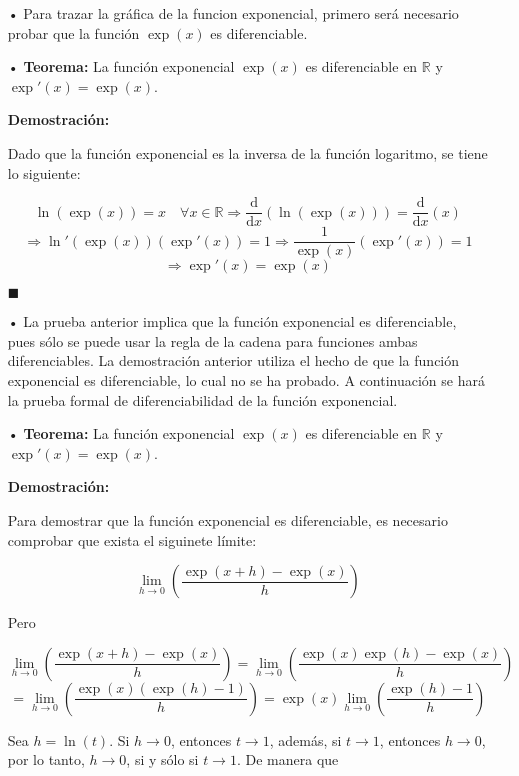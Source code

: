 \documentclass[pts12]{article}
\numberwithin{equation}{section}
\newcommand{\Col}{\color{ProcessBlue}}
\newcommand{\derivate}[2]{\frac{\mathrm{d}}{\mathrm{d}#1} \left(  {#2}  \right)  }
\begin{document}
\begin{itemize}
\item[\Col •] Para trazar la gráfica de la funcion exponencial, primero será necesario probar que la función $\exp(x)$ es diferenciable.

\item[\Col •] \textbf{Teorema:} La función exponencial $\exp(x)$ es diferenciable en $\mathbb{R}$ y $\exp'(x)=\exp(x)$.

\textbf{Demostración:}

Dado que la función exponencial es la inversa de la función logaritmo, se tiene lo siguiente:

$$ \ln(\exp(x))=x \quad \forall x\in\mathbb{R} \Rightarrow \derivate{x}{\ln(\exp(x))}=\derivate{x}{x} $$
$$ \Rightarrow \ln'(\exp(x))(\exp'(x))=1 \Rightarrow \frac{1}{\exp(x)}(\exp'(x))=1 $$
$$ \Rightarrow \exp'(x)=\exp(x) $$

\begin{flushright}
$\blacksquare$
\end{flushright}

\item[\Col •] La prueba anterior implica que la función exponencial es diferenciable, pues sólo se puede usar la regla de la cadena para funciones ambas diferenciables. La demostración anterior utiliza el hecho de que la función exponencial es diferenciable, lo cual no se ha probado. A continuación se hará la prueba formal de diferenciabilidad de la función exponencial.

\item[\Col •] \textbf{Teorema:} La función exponencial $\exp(x)$ es diferenciable en $\mathbb{R}$ y $\exp'(x)=\exp(x)$.

\textbf{Demostración:}  

Para demostrar que la función exponencial es diferenciable, es necesario comprobar que exista el siguinete límite:

$$ \lim_{h\to 0}\left(\frac{\exp(x+h)-\exp(x)}{h}\right) $$

Pero 

$$ \lim_{h\to 0}\left(\frac{\exp(x+h)-\exp(x)}{h}\right)=\lim_{h\to 0}\left(\frac{\exp(x)\exp(h)-\exp(x)}{h}\right) $$
$$ =\lim_{h\to 0}\left(\frac{\exp(x)(\exp(h)-1)}{h}\right)=\exp(x)\lim_{h\to 0}\left(\frac{\exp(h)-1}{h}\right) $$

Sea $h=\ln(t)$. Si $h\to 0$, entonces $t\to 1$, además, si $t\to 1$, entonces $h\to 0$, por lo tanto, $h\to 0$, si y sólo si $t\to 1$. De manera que


\end{itemize}
\end{document}
